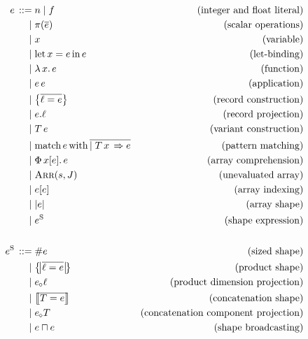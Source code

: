 \begin{align*}
\graintro e
n \mid f  
& \text{(integer and float literal)} 
\graitem
\pi(\overline{e}) 
& \text{(scalar operations)}
\graitem
x
& \text{(variable)}
\graitem
\slet{x}{e}{e}
& \text{(let-binding)}
\graitem
\slam{x}{e}
& \text{(function)}
\graitem
e\,e 
& \text{(application)}
\graitem
\srecordval{\overline{\ell = e}} 
& \text{(record construction)}
\graitem
\sproj{e}{\ell} 
& \text{(record projection)}
\graitem
\stag{T}{e} 
& \text{(variant construction)}
\graitem
\smatch{e}{\overline{\mid T\,x\,\Rightarrow e}} 
& \text{(pattern matching)}
\graitem
\sbuild{x}{e}{e} 
& \text{(array comprehension)}
\graitem
\sarrayval{s}{J} 
& \text{(unevaluated array)}
\graitem
\sindex{e}{e} 
& \text{(array indexing)}
\graitem
\sshape{e} 
& \text{(array shape)} 
\graitem
\eess
& \text{(shape expression)} 
\\ \\
\graintro{\eess}
\ssize{e} 
& \text{(sized shape)}
\graitem
\sproductval{\overline{ \ell = e }} 
& \text{(product shape)} 
\graitem
\sproductproj{e}{\ell} 
& \text{(product dimension projection)}
\graitem
\sconcatval{\overline{ T = e }} & \text{(concatenation shape)}
\graitem
\sconcatproj{e}{T} 
& \text{(concatenation component projection)}
\graitem
\sbroadcast{e}{e} 
& \text{(shape broadcasting)}
\end{align*}